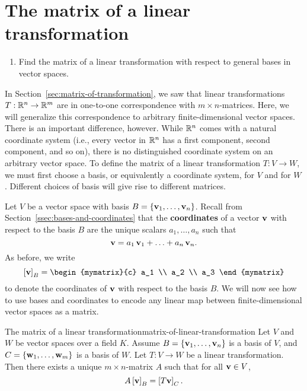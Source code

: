 \section{The matrix of a linear transformation}

\begin{outcome}
  \begin{enumerate}
  \item Find the matrix of a linear transformation with respect to
    general bases in vector spaces.
  \end{enumerate}
\end{outcome}

In Section~\ref{sec:matrix-of-transformation}, we saw that linear
transformations $T:\mathbb{R}^n\to\mathbb{R}^m$ are in one-to-one correspondence with
$m\times n$-matrices. Here, we will generalize this correspondence to
arbitrary finite-dimensional vector spaces. There is an important
difference, however. While $\mathbb{R}^n$ comes with a natural coordinate
system (i.e., every vector in $\mathbb{R}^n$ has a first component, second
component, and so on), there is no distinguished coordinate system on
an arbitrary vector space. To define the matrix of a linear
transformation $T:V\to W$, we must first choose a basis, or
equivalently a coordinate system, for $V$ and for $W$. Different
choices of basis will give rise to different matrices.

Let $V$ be a vector space with basis
$B=\left\{\mbox{\bf v}_1,\ldots,\mbox{\bf v}_n\right\}$. Recall from
Section~\ref{ssec:bases-and-coordinates} that the \textbf{coordinates}
of a vector $\mbox{\bf v}$ with respect to the basis $B$%
%
 are the unique scalars
$a_1,\ldots,a_n$ such that
\begin{equation*}
  \mbox{\bf v} = a_1\,\mbox{\bf v}_1 + \ldots + a_n\,\mbox{\bf v}_n.
\end{equation*}
As before, we write
\begin{equation*}
  \coord{\vect{v}}_B = \begin{mymatrix}{c} a_1 \\ a_2 \\ a_3 \end{mymatrix}
\end{equation*}
to denote the coordinates of $\mbox{\bf v}$ with respect to the basis $B$.
We will now see how to use bases and coordinates to encode any linear
map between finite-dimensional vector spaces as a matrix. 

\begin{proposition}{The matrix of a linear transformation}{matrix-of-linear-transformation}
  Let $V$ and $W$ be vector spaces over a field $K$. Assume
  $B=\left\{\mbox{\bf v}_1,\ldots,\mbox{\bf v}_n\right\}$ is a basis of $V$, and
  $C=\left\{\mbox{\bf w}_1,\ldots,\mbox{\bf w}_m\right\}$ is a basis of $W$.
  Let $T:V\to W$ be a linear transformation. Then there exists a
  unique $m\times n$-matrix $A$ such that for all $\mbox{\bf v}\in V$,
  \begin{equation*}
    A\left[\mbox{\bf v}\right]_B = \left[T\mbox{\bf v}\right]_C.
  \end{equation*}
\end{proposition}


